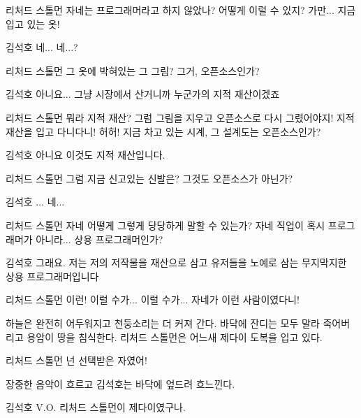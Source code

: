 \documentclass{screenplay}
\begin{document}
    \begin{dialogue}{리처드 스톨먼}
        자네는 프로그래머라고 하지 않았나? 어떻게 이럴 수 있지? 가만... 지금 입고 있는 옷!
    \end{dialogue}
    \begin{dialogue}{김석호}
        네... 네...?
    \end{dialogue}
    \begin{dialogue}{리처드 스톨먼}
        그 옷에 박혀있는 그 그림?
        그거, 오픈소스인가?
    \end{dialogue}
    \begin{dialogue}{김석호}
        아니요... 그냥 시장에서 산거니까
        누군가의 지적 재산이겠죠
    \end{dialogue}
    \begin{dialogue}{리처드 스톨먼}
        뭐라 지적 재산? 그럼 그림을 지우고 오픈소스로 다시 그렸어야지! 지적 재산을 입고 다니다니! 허허!
        지금 차고 있는 시계, 그 설계도는 오픈소스인가?
    \end{dialogue}
    \begin{dialogue}{김석호}
        아니요 이것도 지적 재산입니다.
    \end{dialogue}
    \begin{dialogue}{리처드 스톨먼}
        그럼 지금 신고있는 신발은? 그것도 오픈소스가 아닌가?
    \end{dialogue}
    \begin{dialogue}{김석호}
        ... 네...
    \end{dialogue}
    \begin{dialogue}{리처드 스톨먼}
        자네 어떻게 그렇게 당당하게 말할 수 있는가? 자네 직업이 혹시 프로그래머가 아니라... 상용 프로그래머인가?
    \end{dialogue}
    \begin{dialogue}[낙담한듯]{김석호}
        그래요. 저는 저의 저작물을 재산으로 삼고 유저들을 노예로 삼는 무지막지한 상용 프로그래머입니다
    \end{dialogue}
    \begin{dialogue}{리처드 스톨먼}
        이런! 이럴 수가... 이럴 수가...
        자네가 이런 사람이였다니!
    \end{dialogue}
    하늘은 완전히 어두워지고 천둥소리는 더 커져 간다. 바닥에 잔디는 모두 말라 죽어버리고 용암이 땅을 침식한다. 리처드 스톨먼은 어느새 제다이 도복을 입고 있다.
    \begin{dialogue}[소리치며]{리처드 스톨먼}
        넌 선택받은 자였어!
    \end{dialogue}
    장중한 음악이 흐르고 김석호는 바닥에 엎드려 흐느낀다.
    \begin{dialogue}{김석호}
        V.O. 리처드 스톨먼이 제다이였구나.
    \end{dialogue}
    \fadeout
\end{document}

